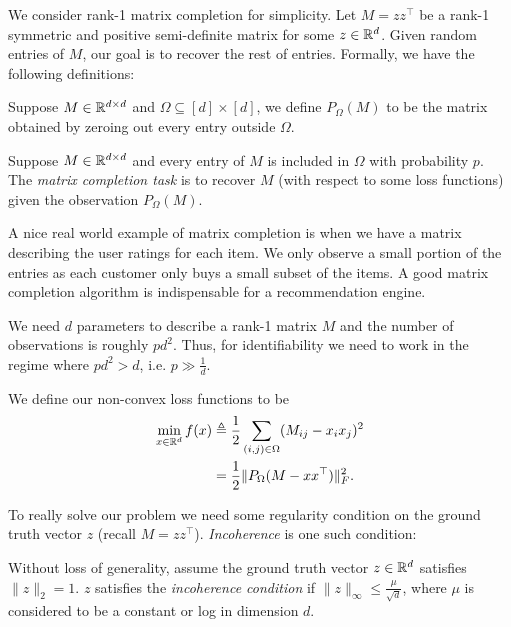 

We consider rank-1 matrix completion for simplicity. Let $M = zz^\top$ be a rank-1 symmetric and positive semi-definite matrix for some $z\in \mathbb R^d$. Given random entries of $M$, our goal is to recover the rest of entries. Formally, we have the following definitions:

\begin{definition}
Suppose $M\in \mathbb R^{d\times d}$ and $\Omega \subseteq [d] \times [d]$, we define $P_{\Omega}(M)$ to be the matrix obtained by zeroing out every entry outside $\Omega$. 
\end{definition}

\begin{definition}
Suppose $M\in \mathbb R^{d\times d}$ and every entry of $M$ is included in $\Omega$ with probability $p$. The \textit{matrix completion task} is to recover $M$ (with respect to some loss functions) given the observation $P_{\Omega}(M)$.
\end{definition}

A nice real world example of matrix completion is when we have a matrix describing the user ratings for each item. We only observe a small portion of the entries as each customer only buys a small subset of the items. A good matrix completion algorithm is indispensable for a recommendation engine. 

\begin{remark}
We need $d$ parameters to describe a rank-1 matrix $M$ and the number of observations is roughly $pd^2$. Thus, for identifiability we need to work in the regime where $pd^2 > d$, i.e. $p \gg \frac{1}{d}$. 
\end{remark}

We define our non-convex loss functions to be 
\begin{align}
    \min_{x \in \mathbb R^d} f(x) & \triangleq \frac{1}{2}\sum_{(i,j)\in \Omega}(M_{ij}-x_ix_j)^2 \\
     & = \frac{1}{2}\|P_{\Omega}(M-xx^\top)\|_F^2.
\end{align}

To really solve our problem we need some regularity condition on the ground truth vector $z$ (recall $M = zz^\top$). \textit{Incoherence} is one such condition:
\begin{definition}[Incoherence]
Without loss of generality, assume the ground truth vector $z\in\mathbb R^d$ satisfies $\|z\|_2 = 1$. $z$ satisfies the \textit{incoherence condition} if $\|z\|_{\infty} \leq \frac{\mu}{\sqrt{d}}$, where $\mu$ is considered to be a constant or log in dimension $d$. 
\end{definition}

